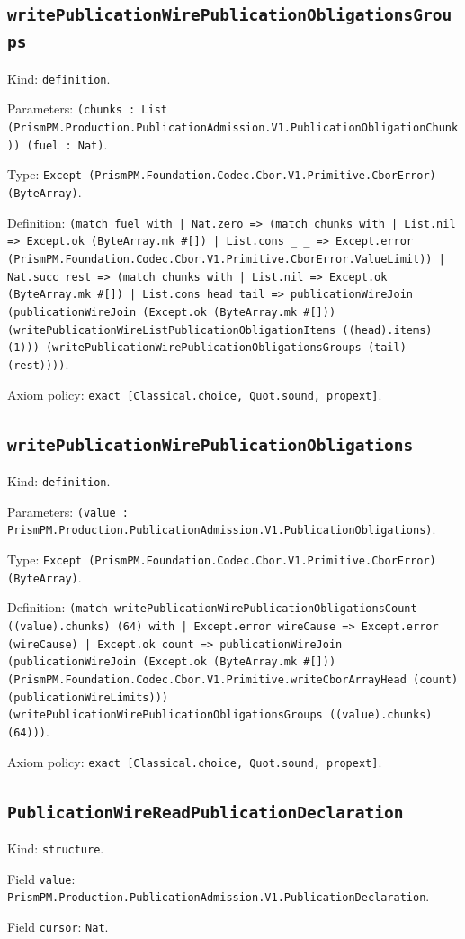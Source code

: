 \documentclass[11pt]{article}
\begin{document}
\subsection*{\texttt{writePublicationWirePublicationObligationsGroups}}
\noindent Kind: \texttt{definition}.\par
\noindent Parameters: \texttt{(chunks : List (PrismPM.Production.PublicationAdmission.V1.PublicationObligationChunk)) (fuel : Nat)}.\par
\noindent Type: \texttt{Except (PrismPM.Foundation.Codec.Cbor.V1.Primitive.CborError) (ByteArray)}.\par
\noindent Definition: \texttt{(match fuel with | Nat.zero => (match chunks with | List.nil => Except.ok (ByteArray.mk \#[]) | List.cons \_ \_ => Except.error (PrismPM.Foundation.Codec.Cbor.V1.Primitive.CborError.ValueLimit)) | Nat.succ rest => (match chunks with | List.nil => Except.ok (ByteArray.mk \#[]) | List.cons head tail => publicationWireJoin (publicationWireJoin (Except.ok (ByteArray.mk \#[])) (writePublicationWireListPublicationObligationItems ((head).items) (1))) (writePublicationWirePublicationObligationsGroups (tail) (rest))))}.\par
\noindent Axiom policy: \texttt{exact [Classical.choice, Quot.sound, propext]}.\par
\subsection*{\texttt{writePublicationWirePublicationObligations}}
\noindent Kind: \texttt{definition}.\par
\noindent Parameters: \texttt{(value : PrismPM.Production.PublicationAdmission.V1.PublicationObligations)}.\par
\noindent Type: \texttt{Except (PrismPM.Foundation.Codec.Cbor.V1.Primitive.CborError) (ByteArray)}.\par
\noindent Definition: \texttt{(match writePublicationWirePublicationObligationsCount ((value).chunks) (64) with | Except.error wireCause => Except.error (wireCause) | Except.ok count => publicationWireJoin (publicationWireJoin (Except.ok (ByteArray.mk \#[])) (PrismPM.Foundation.Codec.Cbor.V1.Primitive.writeCborArrayHead (count) (publicationWireLimits))) (writePublicationWirePublicationObligationsGroups ((value).chunks) (64)))}.\par
\noindent Axiom policy: \texttt{exact [Classical.choice, Quot.sound, propext]}.\par
\subsection*{\texttt{PublicationWireReadPublicationDeclaration}}
\noindent Kind: \texttt{structure}.\par
\noindent Field \texttt{value}: \texttt{PrismPM.Production.PublicationAdmission.V1.PublicationDeclaration}.\par
\noindent Field \texttt{cursor}: \texttt{Nat}.\par
\end{document}
